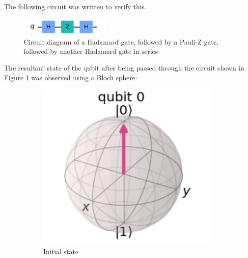 The following circuit was written to verify this.

\begin{figure}[h]
    \centering
    \includegraphics[width=0.4\textwidth]{lab2/images/hzhCircuit.png}
    \caption{Circuit diagram of a Hadamard gate, followed by a Pauli-Z gate, followed by another Hadamard gate in series} 
    \label{fig:hzhCircuit}
\end{figure}

The resultant state of the qubit after being passed through the circuit shown in Figure \ref{fig:hzhCircuit} was observed using a Bloch sphere:

\begin{figure}[h]
    \centering
    \begin{subfigure}[h]{0.24\textwidth}
        \centering
        \includegraphics[width=\textwidth]{lab2/images/hzhGate1.png}
        \caption{Initial state}
        \label{fig:hzhGate1}
    \end{subfigure}
    \hfill
    \begin{subfigure}[h]{0.24\textwidth}
        \centering

\end{subfigure}
\end{figure}

